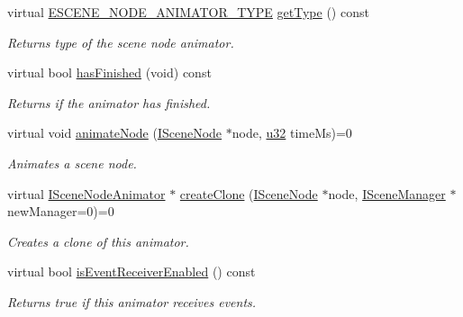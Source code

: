 \begin{DoxyCompactItemize}
virtual \hyperlink{namespaceirr_1_1scene_a327a1e43872705cf8f3f3342fb307d19}{E\+S\+C\+E\+N\+E\+\_\+\+N\+O\+D\+E\+\_\+\+A\+N\+I\+M\+A\+T\+O\+R\+\_\+\+T\+Y\+PE} \hyperlink{classirr_1_1scene_1_1ISceneNodeAnimator_a8d00cd0bc44945c617c0b8fa5c6ddcd5}{get\+Type} () const
\begin{DoxyCompactList}\small\item\em Returns type of the scene node animator. \end{DoxyCompactList}\item 
virtual bool \hyperlink{classirr_1_1scene_1_1ISceneNodeAnimator_a77fd626155079b11327f0bd775e85425}{has\+Finished} (void) const
\begin{DoxyCompactList}\small\item\em Returns if the animator has finished. \end{DoxyCompactList}\item 
virtual void \hyperlink{classirr_1_1scene_1_1ISceneNodeAnimator_ab2170d133db16de148d0f6841c06bc84}{animate\+Node} (\hyperlink{classirr_1_1scene_1_1ISceneNode}{I\+Scene\+Node} $\ast$node, \hyperlink{namespaceirr_a0416a53257075833e7002efd0a18e804}{u32} time\+Ms)=0
\begin{DoxyCompactList}\small\item\em Animates a scene node. \end{DoxyCompactList}\item 
virtual \hyperlink{classirr_1_1scene_1_1ISceneNodeAnimator}{I\+Scene\+Node\+Animator} $\ast$ \hyperlink{classirr_1_1scene_1_1ISceneNodeAnimator_a9cc261c12459fc7d3da6c2595d721c0d}{create\+Clone} (\hyperlink{classirr_1_1scene_1_1ISceneNode}{I\+Scene\+Node} $\ast$node, \hyperlink{classirr_1_1scene_1_1ISceneManager}{I\+Scene\+Manager} $\ast$new\+Manager=0)=0
\begin{DoxyCompactList}\small\item\em Creates a clone of this animator. \end{DoxyCompactList}\item 
virtual bool \hyperlink{classirr_1_1scene_1_1ISceneNodeAnimator_a37b22b8767dc6adca575223f02458740}{is\+Event\+Receiver\+Enabled} () const
\begin{DoxyCompactList}\small\item\em Returns true if this animator receives events. \end{DoxyCompactList}\item 
\mbox{\label{classirr_1_1scene_1_1ISceneNodeAnimator_aca20b841bb586cd9654464b001a7b6aa}} 

\end{DoxyCompactItemize}
